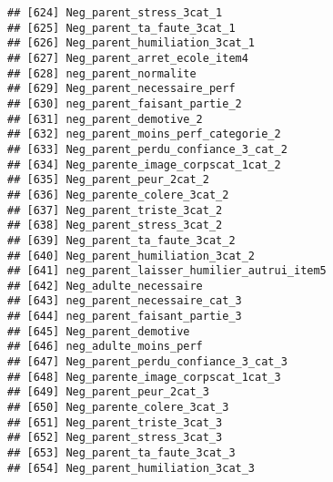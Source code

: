 \documentclass[
]{article}
\begin{document}
\begin{verbatim}
## [624] Neg_parent_stress_3cat_1                                         
## [625] Neg_parent_ta_faute_3cat_1                                       
## [626] Neg_parent_humiliation_3cat_1                                    
## [627] Neg_parent_arret_ecole_item4                                     
## [628] neg_parent_normalite                                             
## [629] Neg_parent_necessaire_perf                                       
## [630] neg_parent_faisant_partie_2                                      
## [631] neg_parent_demotive_2                                            
## [632] neg_parent_moins_perf_categorie_2                                
## [633] Neg_parent_perdu_confiance_3_cat_2                               
## [634] Neg_parente_image_corpscat_1cat_2                                
## [635] Neg_parent_peur_2cat_2                                           
## [636] Neg_parente_colere_3cat_2                                        
## [637] Neg_parent_triste_3cat_2                                         
## [638] Neg_parent_stress_3cat_2                                         
## [639] Neg_parent_ta_faute_3cat_2                                       
## [640] Neg_parent_humiliation_3cat_2                                    
## [641] neg_parent_laisser_humilier_autrui_item5                         
## [642] Neg_adulte_necessaire                                            
## [643] neg_parent_necessaire_cat_3                                      
## [644] neg_parent_faisant_partie_3                                      
## [645] Neg_parent_demotive                                              
## [646] neg_adulte_moins_perf                                            
## [647] Neg_parent_perdu_confiance_3_cat_3                               
## [648] Neg_parente_image_corpscat_1cat_3                                
## [649] Neg_parent_peur_2cat_3                                           
## [650] Neg_parente_colere_3cat_3                                        
## [651] Neg_parent_triste_3cat_3                                         
## [652] Neg_parent_stress_3cat_3                                         
## [653] Neg_parent_ta_faute_3cat_3                                       
## [654] Neg_parent_humiliation_3cat_3
\end{verbatim}
\end{document}
